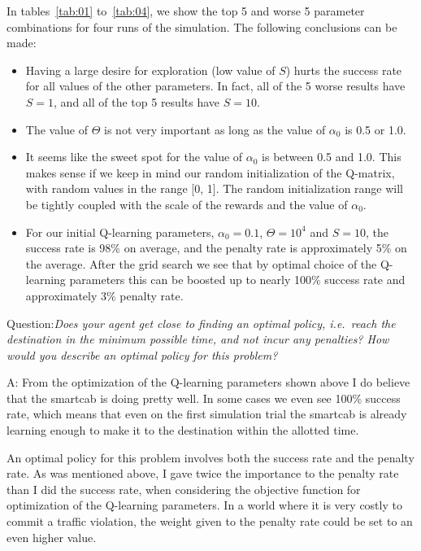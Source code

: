 \documentclass[conference]{IEEEtran}
\begin{document}
In tables~\ref{tab:01} to~\ref{tab:04}, we show the top 5 and worse 5 parameter
combinations for four runs of the simulation.  The following conclusions can
be made:
\begin{itemize}
\item Having a large desire for exploration (low value of $S$) hurts the
success rate for all values of the other parameters. In fact, all of the 5
worse results have $S=1$, and all of the top 5 results have $S=10$.  

\item The value of $\Theta$ is not very important as long as the value of
$\alpha_0$ is 0.5 or 1.0. 

\item It seems like the sweet spot for the value of $\alpha_{0}$ is between 0.5
and 1.0.  This makes sense if we keep in mind our random initialization of the
Q-matrix, with random values in the range [0, 1].  The random initialization
range will be tightly coupled with the scale of the rewards and the value of
$\alpha_0$. 

\item For our initial Q-learning parameters, $\alpha_{0} = 0.1$, $\Theta =
10^{4}$ and $S=10$, the success rate is 98\% on average, and the penalty rate
is approximately 5\% on the average.  After the grid search we see that by optimal choice of the
Q-learning parameters this can be boosted up to nearly 100\% success rate and
approximately 3\% penalty rate.

\end{itemize}
 

\vspace{1em} \noindent Question:\textit{Does your agent get close to finding an
optimal policy, i.e.\ reach the destination in the minimum possible time, and
not incur any penalties? How would you describe an optimal policy for this
problem?}

\vspace{2em} \noindent A: From the optimization of the Q-learning parameters
shown above I do believe that the smartcab is doing pretty well.  In some cases
we even see 100\% success rate, which means that even on the first simulation
trial the smartcab is already learning enough to make it to the destination
within the allotted time.

An optimal policy for this problem involves both the success rate and the
penalty rate. As was mentioned above, I gave twice the importance to the
penalty rate than I did the success rate, when considering the objective
function for optimization of the Q-learning parameters.  In a world where it is
very costly to commit a traffic violation, the weight given to the penalty
rate could be set to an even higher value. 
\end{document}
